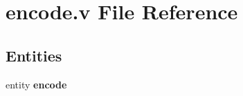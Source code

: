 \section{encode.\-v File Reference}
\label{encode_8v}
\subsection*{Entities}
\begin{DoxyCompactItemize}
\item 
entity {\bf encode}
\end{DoxyCompactItemize}
